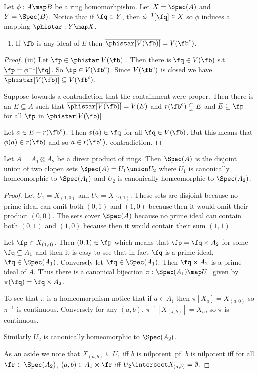 \documentclass[oneside,12pt]{amsart}
\begin{document}
\begin{exercise}[exercise 21]Let $\phi:A\map B$ be a ring homomorhpishm. Let $X=\Spec(A)$
and $Y=\Spec(B)$. Notice that if $\fq\in Y$, then $\phi^{-1}[\fq]\in X$ so $\phi$ induces a mapping
$\phistar:Y\map X$.
\begin{enumerate}
\item[(iii)] If $\fb$ is any ideal of $B$ then $\overline{\phistar[V(\fb)]} = V(\fb^c)$.
\end{enumerate}
\end{exercise}
\begin{proof}
(iii) Let $\fp\in \phistar[V(\fb)]$. Then there is $\fq\in V(\fb)$ s.t.
$\fp=\phi^{-1}[\fq]$. So $\fp\in V(\fb^c)$. Since $V(\fb^c)$ is closed we have
$\overline{\phistar[V(\fb)]} \subseteq V(\fb^c)$.

Suppose towards a contradiction that the containment were proper.
Then there is an $E\subseteq A$
such that $\overline{\phistar[V(\fb)]} = V(E)$ and $r(\fb^c) \subsetneqq E$
and $E\subseteq\fp$ for all $\fp$ in $\phistar[V(\fb)]$.

Let $a\in E - r(\fb^c)$. Then $\phi(a)\in\fq$ for all $\fq\in V(\fb)$. But this means that
$\phi(a)\in r(\fb)$ and so $a\in r(\fb^c)$, contradiction.
\end{proof}

\begin{exercise}[exercise 22] Let $A = A_1 \otimes A_2$ be a direct product of rings.
Then $\Spec(A)$ is the disjoint union of two clopen sets $\Spec(A) = U_1 \union U_2$
where $U_1$ is canonically homeomorphic to $\Spec(A_1)$ and $U_2$ is canonically
homeomorphic to $\Spec(A_2)$.
\end{exercise}
\begin{proof}
Let $U_1=X_{(1,0)}$ and $U_2=X_{(0, 1)}$. These sets are disjoint because no prime ideal
can omit both $(0, 1)$ and $(1,0)$ because then it would omit their product $(0, 0)$.
The sets cover $\Spec(A)$ because no prime ideal can contain both $(0, 1)$ and
$(1, 0)$ because then it would contain their sum $(1, 1)$.

Let $\fp\in X_{(1, 0)}$.
Then $(0, 1) \in \fp$ which means that $\fp = \fq \times A_2$ for some $\fq \subseteq A_1$ and then
it is easy to see that in fact $\fq$ is a prime ideal, $\fq \in \Spec(A_1)$.
Conversely let $\fq \in \Spec(A_1)$. Then $\fq \times A_2$ is a prime ideal of $A$.
Thus there is a canonical bijection $\pi:\Spec(A_1) \map U_1$ given by
$\pi(\fq) = \fq \times A_2$.

To see that $\pi$ is a homeomorphism notice that if $a\in A_1$ then $\pi[X_a]=X_{(a, 0)}$ so
$\pi^{-1}$ is continuous. Conversely for any $(a, b)$, $\pi^{-1}[X_{(a,b)}] = X_a$, so $\pi$  is continuous.

Similarly $U_2$ is canonically homeomorphic to $\Spec(A_2)$.

As an aside we note that $X_{(a, b)} \subseteq U_1$ iff $b$ is nilpotent. pf. $b$ is nilpotent iff
for all $\fr\in\Spec(A_2)$, $(a,b)\in A_1 \times \fr$ iff $U_2 \intersect X_{(a,b)}=\emptyset$.
\end{proof}




\end{document}
